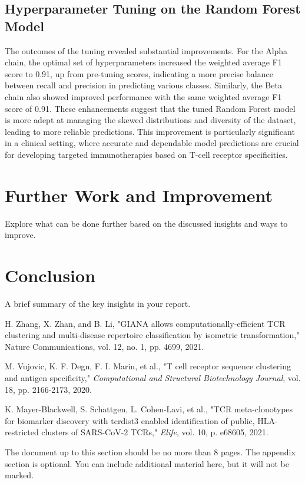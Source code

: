 \documentclass[conference]{IEEEtran}
\begin{document}
    \subsection{Hyperparameter Tuning on the Random Forest Model}

    The outcomes of the tuning revealed substantial improvements. For the Alpha chain, the optimal set of hyperparameters increased the weighted average F1 score to 0.91, up from pre-tuning scores, indicating a more precise balance between recall and precision in predicting various classes. Similarly, the Beta chain also showed improved performance with the same weighted average F1 score of 0.91. These enhancements suggest that the tuned Random Forest model is more adept at managing the skewed distributions and diversity of the dataset, leading to more reliable predictions. This improvement is particularly significant in a clinical setting, where accurate and dependable model predictions are crucial for developing targeted immunotherapies based on T-cell receptor specificities.
	
	\section{Further Work and Improvement}
	{\color{blue}Explore what can be done further based on the discussed insights and ways to improve.}
    
	
	\section{Conclusion}
	{\color{blue}A brief summary of the key insights in your report.}
	
	\begin{thebibliography}{00}
		
		 H. Zhang, X. Zhan, and B. Li, "GIANA allows computationally-efficient TCR clustering and multi-disease repertoire classification by isometric transformation," Nature Communications, vol. 12, no. 1, pp. 4699, 2021.
		
		 M. Vujovic, K. F. Degn, F. I. Marin, et al., "T cell receptor sequence clustering and antigen specificity," \textit{Computational and Structural Biotechnology Journal}, vol. 18, pp. 2166-2173, 2020.
		
		 K. Mayer-Blackwell, S. Schattgen, L. Cohen-Lavi, et al., "TCR meta-clonotypes for biomarker discovery with tcrdist3 enabled identification of public, HLA-restricted clusters of SARS-CoV-2 TCRs," \textit{Elife}, vol. 10, p. e68605, 2021.
		
	\end{thebibliography}
	
	\appendix
	{\color{blue}The document up to this section should be no more than 8 pages. The appendix section is optional. You can include additional material here, but it will not be marked.}
	
    
\end{document}

